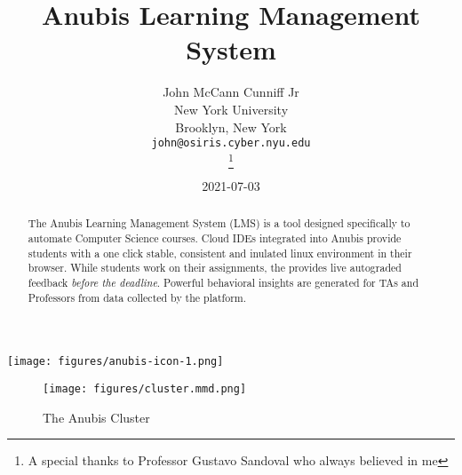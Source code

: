 \documentclass[12pt]{report}
\title{Anubis Learning Management System}
\date{2021-07-03}
\author{%
    John McCann Cunniff Jr \\
    New York University\\
    Brooklyn, New York \\
    \texttt{john@osiris.cyber.nyu.edu} \\
    \thanks{A special thanks to Professor Gustavo Sandoval who always believed in me} \\
}
\begin{document}
    \begin{titlepage}

        \maketitle

        \vspace{0.3cm}
        \begin{center}
            \texttt{[image: figures/anubis-icon-1.png]}
        \end{center}
        \vspace{0.3cm}

        \begin{abstract}
            The Anubis Learning Management System (LMS) is a tool designed specifically to automate Computer Science courses. 
            Cloud IDEs integrated into Anubis provide students with a one click stable, consistent and inulated linux environment
            in their browser.
            While students work on their assignments, the provides live autograded feedback \textit{before the deadline}.
            Powerful behavioral insights are generated for TAs and Professors from data collected by the platform.
        \end{abstract}


    \end{titlepage}

    \tableofcontents

    \pagebreak

    \begin{figure}[h]
        \centering
        \texttt{[image: figures/cluster.mmd.png]}
        \caption{The Anubis Cluster\label{fig:cluster}}
    \end{figure}


    

    

    

    

    

    
\end{document}

